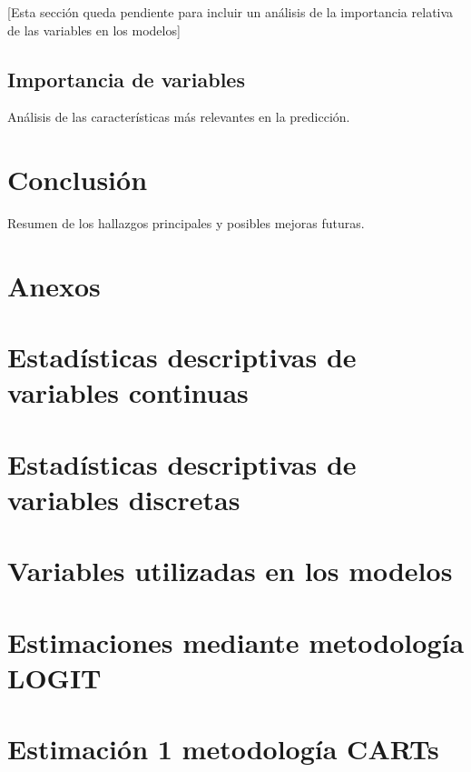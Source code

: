 \documentclass[12pt,a4paper,onecolumn]{article}
\begin{document}
[Esta sección queda pendiente para incluir un análisis de la importancia relativa de las variables en los modelos]

\subsection{Importancia de variables}
Análisis de las características más relevantes en la predicción.

\section{Conclusión}
Resumen de los hallazgos principales y posibles mejoras futuras.


\clearpage
\appendix
\section*{Anexos}

\section{Estadísticas descriptivas de variables continuas}


\section{Estadísticas descriptivas de variables discretas}


\section{Variables utilizadas en los modelos}


\section{Estimaciones mediante metodología LOGIT}


\section{Estimación 1 metodología CARTs}

\end{document}
